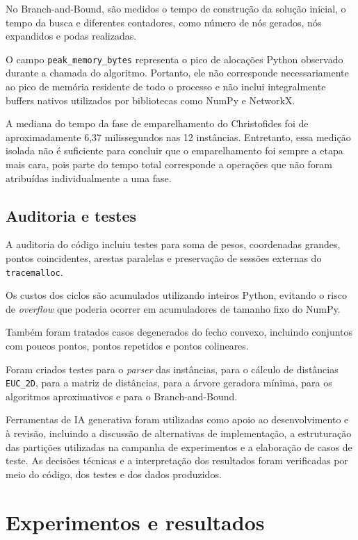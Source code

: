 \documentclass[12pt]{article}
\begin{document}
No Branch-and-Bound, são medidos o tempo de construção da solução inicial, o tempo da busca e diferentes contadores, como número de nós gerados, nós expandidos e podas realizadas.

O campo \texttt{peak\_memory\_bytes} representa o pico de alocações Python observado durante a chamada do algoritmo. Portanto, ele não corresponde necessariamente ao pico de memória residente de todo o processo e não inclui integralmente buffers nativos utilizados por bibliotecas como NumPy e NetworkX.

A mediana do tempo da fase de emparelhamento do Christofides foi de aproximadamente 6,37 milissegundos nas 12 instâncias. Entretanto, essa medição isolada não é suficiente para concluir que o emparelhamento foi sempre a etapa mais cara, pois parte do tempo total corresponde a operações que não foram atribuídas individualmente a uma fase.

\subsection{Auditoria e testes}

A auditoria do código incluiu testes para soma de pesos, coordenadas grandes, pontos coincidentes, arestas paralelas e preservação de sessões externas do \texttt{tracemalloc}.

Os custos dos ciclos são acumulados utilizando inteiros Python, evitando o risco de \emph{overflow} que poderia ocorrer em acumuladores de tamanho fixo do NumPy.

Também foram tratados casos degenerados do fecho convexo, incluindo conjuntos com poucos pontos, pontos repetidos e pontos colineares.

Foram criados testes para o \emph{parser} das instâncias, para o cálculo de distâncias \texttt{EUC\_2D}, para a matriz de distâncias, para a árvore geradora mínima, para os algoritmos aproximativos e para o Branch-and-Bound.

Ferramentas de IA generativa foram utilizadas como apoio ao desenvolvimento e à revisão, incluindo a discussão de alternativas de implementação, a estruturação das partições utilizadas na campanha de experimentos e a elaboração de casos de teste. As decisões técnicas e a interpretação dos resultados foram verificadas por meio do código, dos testes e dos dados produzidos.

\section{Experimentos e resultados}
\end{document}
